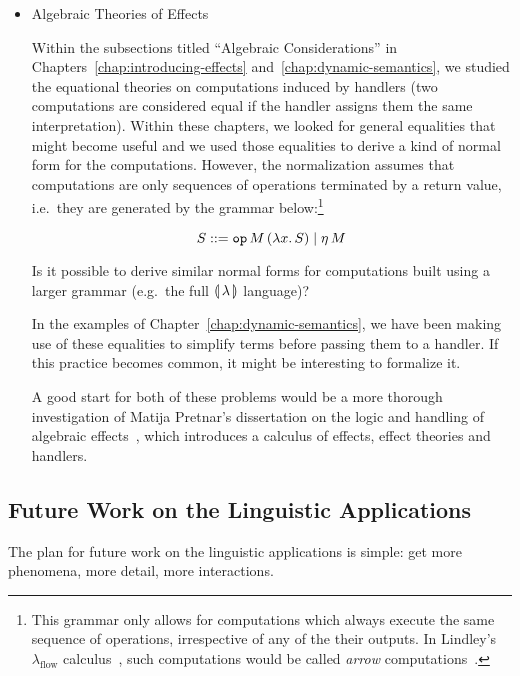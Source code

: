 \begin{itemize}
\item Algebraic Theories of Effects

  Within the subsections titled ``Algebraic Considerations'' in
  Chapters~\ref{chap:introducing-effects} and~\ref{chap:dynamic-semantics},
  we studied the equational theories on computations induced by handlers
  (two computations are considered equal if the handler assigns them the
  same interpretation). Within these chapters, we looked for general
  equalities that might become useful and we used those equalities to
  derive a kind of normal form for the computations. However, the
  normalization assumes that computations are only sequences of operations
  terminated by a return value, i.e.\ they are generated by the grammar
  below:\footnote{This grammar only allows for computations which always
    execute the same sequence of operations, irrespective of any of the
    their outputs. In Lindley's $\lambda_{\textrm{flow}}$
    calculus~\cite{lindley2014algebraic}, such computations would be called
    \emph{arrow} computations~\cite{hughes2000generalising}.}

  $$
    S ::= \mathtt{op}\,M\,(\lambda x.\, S) \mid \eta\,M
  $$

  Is it possible to derive similar normal forms for computations built
  using a larger grammar (e.g.\ the full ${\llparenthesis \, \lambda \, \rrparenthesis}$ language)?

  In the examples of Chapter~\ref{chap:dynamic-semantics}, we have been
  making use of these equalities to simplify terms before passing them to a
  handler. If this practice becomes common, it might be interesting to
  formalize it.

  A good start for both of these problems would be a more thorough
  investigation of Matija Pretnar's dissertation on the logic and handling
  of algebraic effects~\cite{pretnar2010logic}, which introduces a calculus
  of effects, effect theories and handlers.

  
\end{itemize}


\subsection{Future Work on the Linguistic Applications}
\label{ssec:future-work-linguistic}

The plan for future work on the linguistic applications is simple: get more
phenomena, more detail, more interactions.

